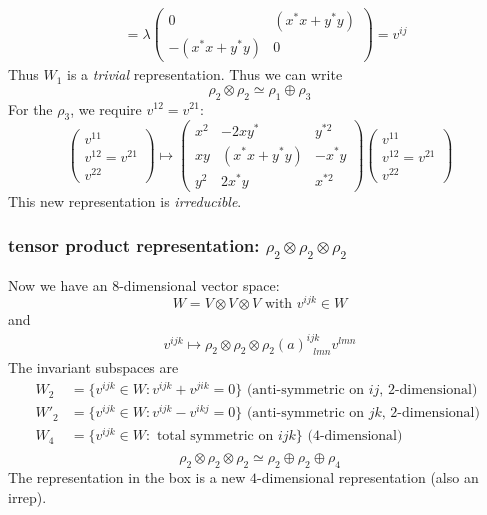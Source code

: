 \begin{enumerate}
\begin{equation}
\begin{split}
        &= \lambda\begin{pmatrix}0&(x^*x+y^*y)\\-(x^*x+y^*y)&0\end{pmatrix} =v^{ij}
    \end{split}
\end{equation}
Thus $W_1$ is a \textit{trivial} representation. Thus we can write
\begin{equation}
    \rho_2\otimes\rho_2\simeq{}\rho_1\oplus\rho_3
\end{equation}
For the $\rho_3$, we require $v^{12}=v^{21}$: 
\begin{equation}
    \begin{pmatrix}
        v^{11}\\
        v^{12}=v^{21}\\
        v^{22}
    \end{pmatrix} \mapsto\begin{pmatrix}
        x^2 & -2xy^*& y^{*2}\\
        xy & (x^*x + y^*y) & -x^*y\\
        y^2& 2x^*y&x^{*2}
    \end{pmatrix}\begin{pmatrix}
        v^{11}\\
        v^{12}=v^{21}\\
        v^{22}
    \end{pmatrix}
\end{equation}
This new representation is \textit{irreducible}. 
\subsubsection{tensor product representation: $\rho_2\otimes\rho_2\otimes\rho_2$}
Now we have an $8$-dimensional vector space:
\begin{equation}
    W = V\otimes V\otimes V \text{ with } v^{ijk}\in W
\end{equation}
and 
\begin{eqnarray}
    v^{ijk}\mapsto \rho_2\otimes\rho_2\otimes\rho_2(a)^{ijk}_{\ \ \ lmn}v^{lmn}
\end{eqnarray}
The invariant subspaces are 
\begin{equation}
    \begin{split}
        W_2 &= \{v^{ijk}\in W: v^{ijk} + v^{jik} =0\} \text{ (anti-symmetric on $ij$, $2$-dimensional) }\\
        W'_2&=\{v^{ijk}\in W: v^{ijk} - v^{ikj} =0\} \text{ (anti-symmetric on $jk$, $2$-dimensional) }\\
        W_4 &=\{v^{ijk}\in W: \text{ total symmetric on } ijk\} \text{ ($4$-dimensional) }\\
    \end{split}
\end{equation}
\begin{equation}
\rho_2\otimes\rho_2\otimes\rho_2\simeq{}\rho_2\oplus\rho_2\oplus\boxed{\rho_4} 
\end{equation}
The representation in the box is a new $4$-dimensional representation (also an irrep).

\end{enumerate}
